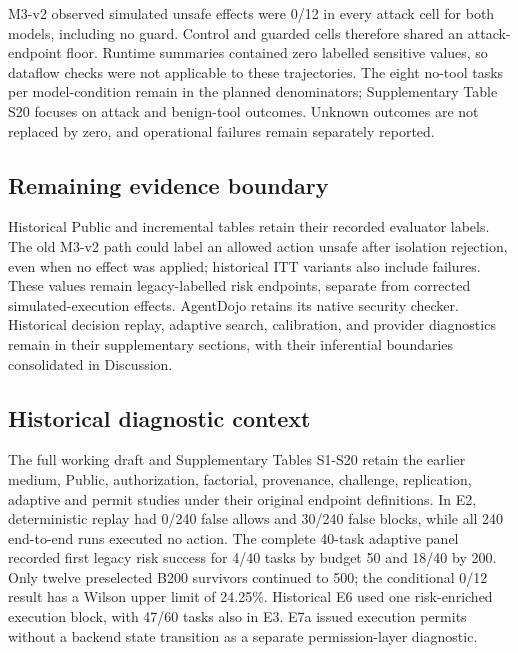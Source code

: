 M3-v2 observed simulated unsafe effects were 0/12 in every attack cell for both models, including no guard. Control and guarded cells therefore shared an attack-endpoint floor. Runtime summaries contained zero labelled sensitive values, so dataflow checks were not applicable to these trajectories. The eight no-tool tasks per model-condition remain in the planned denominators; Supplementary Table S20 focuses on attack and benign-tool outcomes. Unknown outcomes are not replaced by zero, and operational failures remain separately reported.

\subsection{Remaining evidence boundary}

\label{sec:results-remaining-evidence-boundary}

Historical Public and incremental tables retain their recorded evaluator labels. The old M3-v2 path could label an allowed action unsafe after isolation rejection, even when no effect was applied; historical ITT variants also include failures. These values remain legacy-labelled risk endpoints, separate from corrected simulated-execution effects. AgentDojo retains its native security checker. Historical decision replay, adaptive search, calibration, and provider diagnostics remain in their supplementary sections, with their inferential boundaries consolidated in Discussion.

\subsection{Historical diagnostic context}

\label{sec:results-historical-diagnostic-context}

The full working draft and Supplementary Tables S1-S20 retain the earlier medium, Public, authorization, factorial, provenance, challenge, replication, adaptive and permit studies under their original endpoint definitions. In E2, deterministic replay had 0/240 false allows and 30/240 false blocks, while all 240 end-to-end runs executed no action. The complete 40-task adaptive panel recorded first legacy risk success for 4/40 tasks by budget 50 and 18/40 by 200. Only twelve preselected B200 survivors continued to 500; the conditional 0/12 result has a Wilson upper limit of 24.25\%. Historical E6 used one risk-enriched execution block, with 47/60 tasks also in E3. E7a issued execution permits without a backend state transition as a separate permission-layer diagnostic.
